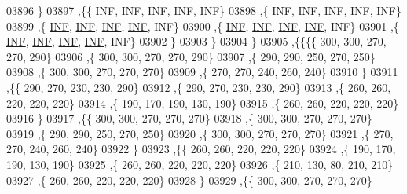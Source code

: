 \begin{DoxyCode}
03896     \}
03897    ,\{\{   \hyperlink{constants_8h_a12c2040f25d8e3a7b9e1c2024c618cb6}{INF},   \hyperlink{constants_8h_a12c2040f25d8e3a7b9e1c2024c618cb6}{INF},   \hyperlink{constants_8h_a12c2040f25d8e3a7b9e1c2024c618cb6}{INF},   \hyperlink{constants_8h_a12c2040f25d8e3a7b9e1c2024c618cb6}{INF},   INF\}
03898     ,\{   \hyperlink{constants_8h_a12c2040f25d8e3a7b9e1c2024c618cb6}{INF},   \hyperlink{constants_8h_a12c2040f25d8e3a7b9e1c2024c618cb6}{INF},   \hyperlink{constants_8h_a12c2040f25d8e3a7b9e1c2024c618cb6}{INF},   \hyperlink{constants_8h_a12c2040f25d8e3a7b9e1c2024c618cb6}{INF},   INF\}
03899     ,\{   \hyperlink{constants_8h_a12c2040f25d8e3a7b9e1c2024c618cb6}{INF},   \hyperlink{constants_8h_a12c2040f25d8e3a7b9e1c2024c618cb6}{INF},   \hyperlink{constants_8h_a12c2040f25d8e3a7b9e1c2024c618cb6}{INF},   \hyperlink{constants_8h_a12c2040f25d8e3a7b9e1c2024c618cb6}{INF},   INF\}
03900     ,\{   \hyperlink{constants_8h_a12c2040f25d8e3a7b9e1c2024c618cb6}{INF},   \hyperlink{constants_8h_a12c2040f25d8e3a7b9e1c2024c618cb6}{INF},   \hyperlink{constants_8h_a12c2040f25d8e3a7b9e1c2024c618cb6}{INF},   \hyperlink{constants_8h_a12c2040f25d8e3a7b9e1c2024c618cb6}{INF},   INF\}
03901     ,\{   \hyperlink{constants_8h_a12c2040f25d8e3a7b9e1c2024c618cb6}{INF},   \hyperlink{constants_8h_a12c2040f25d8e3a7b9e1c2024c618cb6}{INF},   \hyperlink{constants_8h_a12c2040f25d8e3a7b9e1c2024c618cb6}{INF},   \hyperlink{constants_8h_a12c2040f25d8e3a7b9e1c2024c618cb6}{INF},   INF\}
03902     \}
03903    \}
03904   \}
03905  ,\{\{\{\{   300,   300,   270,   270,   290\}
03906     ,\{   300,   300,   270,   270,   290\}
03907     ,\{   290,   290,   250,   270,   250\}
03908     ,\{   300,   300,   270,   270,   270\}
03909     ,\{   270,   270,   240,   260,   240\}
03910     \}
03911    ,\{\{   290,   270,   230,   230,   290\}
03912     ,\{   290,   270,   230,   230,   290\}
03913     ,\{   260,   260,   220,   220,   220\}
03914     ,\{   190,   170,   190,   130,   190\}
03915     ,\{   260,   260,   220,   220,   220\}
03916     \}
03917    ,\{\{   300,   300,   270,   270,   270\}
03918     ,\{   300,   300,   270,   270,   270\}
03919     ,\{   290,   290,   250,   270,   250\}
03920     ,\{   300,   300,   270,   270,   270\}
03921     ,\{   270,   270,   240,   260,   240\}
03922     \}
03923    ,\{\{   260,   260,   220,   220,   220\}
03924     ,\{   190,   170,   190,   130,   190\}
03925     ,\{   260,   260,   220,   220,   220\}
03926     ,\{   210,   130,    80,   210,   210\}
03927     ,\{   260,   260,   220,   220,   220\}
03928     \}
03929    ,\{\{   300,   300,   270,   270,   270\}

\end{DoxyCode}

